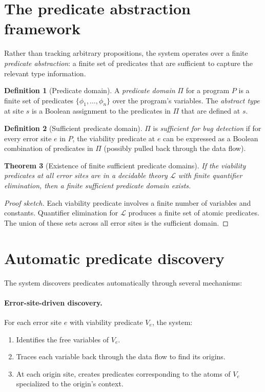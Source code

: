 \documentclass[11pt]{report}
\theoremstyle{definition}
\newtheorem{definition}{Definition}[section]
\theoremstyle{plain}
\newtheorem{theorem}[definition]{Theorem}
\begin{document}
\section{The predicate abstraction framework}

Rather than tracking arbitrary propositions, the system operates over a
finite \emph{predicate abstraction}: a finite set of predicates that are
sufficient to capture the relevant type information.

\begin{definition}[Predicate domain]
A \emph{predicate domain} $\Pi$ for a program $P$ is a finite set of
predicates $\{\phi_1, \ldots, \phi_n\}$ over the program's variables. The
\emph{abstract type} at site $s$ is a Boolean assignment to the predicates
in $\Pi$ that are defined at $s$.
\end{definition}

\begin{definition}[Sufficient predicate domain]
$\Pi$ is \emph{sufficient for bug detection} if for every error site $e$ in
$P$, the viability predicate at $e$ can be expressed as a Boolean
combination of predicates in $\Pi$ (possibly pulled back through the
data flow).
\end{definition}

\begin{theorem}[Existence of finite sufficient predicate domains]
If the viability predicates at all error sites are in a decidable theory
$\mathcal{L}$ with finite quantifier elimination, then a finite sufficient
predicate domain exists.
\end{theorem}

\begin{proof}[Proof sketch]
Each viability predicate involves a finite number of variables and constants.
Quantifier elimination for $\mathcal{L}$ produces a finite set of atomic
predicates. The union of these sets across all error sites is the sufficient
domain.
\end{proof}

\section{Automatic predicate discovery}

The system discovers predicates automatically through several mechanisms:

\paragraph{Error-site-driven discovery.}
For each error site $e$ with viability predicate $V_e$, the system:
\begin{enumerate}[nosep]
  \item Identifies the free variables of $V_e$.
  \item Traces each variable back through the data flow to find its origins.
  \item At each origin site, creates predicates corresponding to the atoms
        of $V_e$ specialized to the origin's context.
\end{enumerate}
\end{document}
